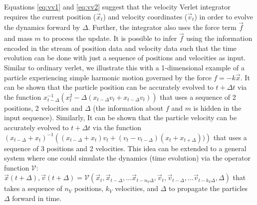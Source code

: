 \documentclass[aps,prl,twocolumn,superscriptaddress,tightenlines,longbibliography, reprint]{revtex4-1}
\begin{document}
Equations \ref{eq:vv1} and \ref{eq:vv2} suggest that the velocity Verlet integrator requires the current position ($\vec{x}_t$) and velocity coordinates ($\vec{v}_t$) in order to evolve the dynamics forward by $\Delta$. Further, the integrator also uses the force term $\vec{f}$ and mass $m$ to process the update. It is possible to infer $\vec{f}$ using the information encoded in the stream of position data and velocity data such that the time evolution can be done with just a sequence of positions and velocities as input. Similar to ordinary verlet, we illustrate this with a 1-dimensional example of a particle experiencing simple harmonic motion governed by the force $f = -k \vec{x}$. It can be shown that 
the particle position can be accurately evolved to $t+\Delta t$ via the function $x_{t-\Delta}^{-1}\left( x_{t}^2 - \Delta (x_{t-\Delta} v_{t} + x_{t-\Delta} v_{t}) \right)$ that uses a sequence of 2 positions, 2 velocities and $\Delta$ (the information about $f$ and $m$ is hidden in the input sequence). Similarly, It can be shown that 
the particle velocity can be accurately evolved to $t+\Delta t$ via the function $(x_{t-\Delta}+ x_{t})^{-1}\left( (x_{t-\Delta}+ x_{t})v_t + (v_{t} - v_{t-\Delta})(x_{t} + x_{t+\Delta}) ) \right)$ that uses a sequence of 3 positions and 2 velocities. This idea can be extended to a general system where one could simulate the dynamics (time evolution) via the operator function $\mathcal{V}$: $\vec{x}(t+\Delta), \vec{v}(t+\Delta) = \mathcal{V}\left(\vec{x}_t,  \vec{x}_{t-\Delta}, \ldots \vec{x}_{t-n_V\Delta}, \vec{v}_t,  \vec{v}_{t-\Delta}, \ldots \vec{v}_{t-k_V\Delta}, \Delta \right)$ that takes a sequence of $n_V$ positions, $k_V$ velocities, and $\Delta$ to propagate the particles $\Delta$ forward in time.
\end{document}
